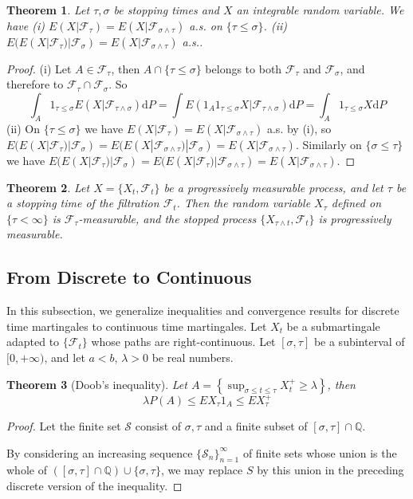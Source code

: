 \documentclass{article}
\newtheorem{Thm}{Theorem}[section]
\theoremstyle{definition}
\renewcommand{\leq}{\leqslant}
\renewcommand{\geq}{\geqslant}
\newcommand{\<}{\left\langle}
\renewcommand{\>}{\right\rangle}
\begin{document}
\begin{Thm}
    Let $\tau,\sigma$ be stopping times and $X$ an integrable random variable. We have \newline 
    (i) $E(X|\mathcal{F}_\tau)=E(X|\mathcal{F}_{\sigma\wedge \tau})$ a.s. on $\{\tau\leq \sigma\}$.\newline 
    (ii) $E(E(X|\mathcal{F}_\tau)|\mathcal{F}_\sigma)=E(X|\mathcal{F}_{\sigma\wedge \tau})$ a.s..
\end{Thm}
\begin{proof}
    (i) Let $A\in\mathcal{F}_\tau$, then $A\cap \{\tau\leq \sigma\}$ belongs to both $\mathcal{F}_\tau$ and $\mathcal{F}_\sigma$, and therefore to $\mathcal{F}_\tau\cap\mathcal{F}_\sigma$. So 
    \[ \int_A 1_{\tau\leq \sigma} E(X|\mathcal{F}_{\tau\wedge\sigma})\mathrm{d}P=\int E(1_A1_{\tau\leq \sigma}X|\mathcal{F}_{\tau\wedge\sigma})\mathrm{d}P=\int_A1_{\tau\leq \sigma}X\mathrm{d}P\]
    (ii) On $\{\tau\leq\sigma\}$ we have $E(X|\mathcal{F}_\tau)=E(X|\mathcal{F}_{\sigma\wedge \tau})$ a.s. by (i), so 
    $E(E(X|\mathcal{F}_\tau)|\mathcal{F}_\sigma)=E(E(X|\mathcal{F}_{\sigma\wedge \tau})|\mathcal{F}_\sigma)=E(X|\mathcal{F}_{\sigma\wedge \tau})$. Similarly on
    $\{\sigma\leq \tau\}$ we have $E(E(X|\mathcal{F}_\tau)|\mathcal{F}_\sigma)=E(E(X|\mathcal{F}_\tau)|\mathcal{F}_{\sigma\wedge \tau})=E(X|\mathcal{F}_{\sigma\wedge \tau})$.
\end{proof}
\begin{Thm}
    Let $X=\{X_t,\mathcal{F}_t\}$ be a progressively measurable process, and let $\tau$ be a stopping time of the filtration $\mathcal{F}_t$.
    Then the random variable $X_\tau$ defined on $\{\tau<\infty\}$ is $\mathcal{F}_\tau$-measurable, and the stopped process 
    $\{X_{\tau\wedge t},\mathcal{F}_t\}$ is progressively measurable.
\end{Thm}



\subsection{From Discrete to Continuous}
In this subsection, we generalize inequalities and convergence results for discrete time martingales to continuous time martingales.\newline 
Let $X_t$ be a submartingale adapted to $\{\mathcal{F}_t\}$ whose paths are right-continuous. Let $[\sigma,\tau]$ be a subinterval of $[0,+\infty)$,
and let $a<b$, $\lambda>0$ be real numbers.
\begin{Thm}[Doob's inequality]
    Let $A=\left\{ \sup_{\sigma\leq t\leq \tau}X_t^+  \geq\lambda\right\}$, then \[\lambda P(A)\leq EX_\tau1_A\leq EX_\tau^+\]
\end{Thm}
\begin{proof}
    Let the finite set $\mathcal{S}$ consist of $\sigma,\tau$ and a finite subset of $[\sigma,\tau]\cap \mathbb{Q}$.

    By considering an increasing sequence $\{\mathcal{S}_n\}_{n=1}^\infty$ of finite sets whose union is the whole of $([\sigma,\tau]\cap \mathbb{Q})\cup\{\sigma,\tau\}$,
    we may replace $S$ by this union in the preceding discrete version of the inequality.
\end{proof}
\end{document}
